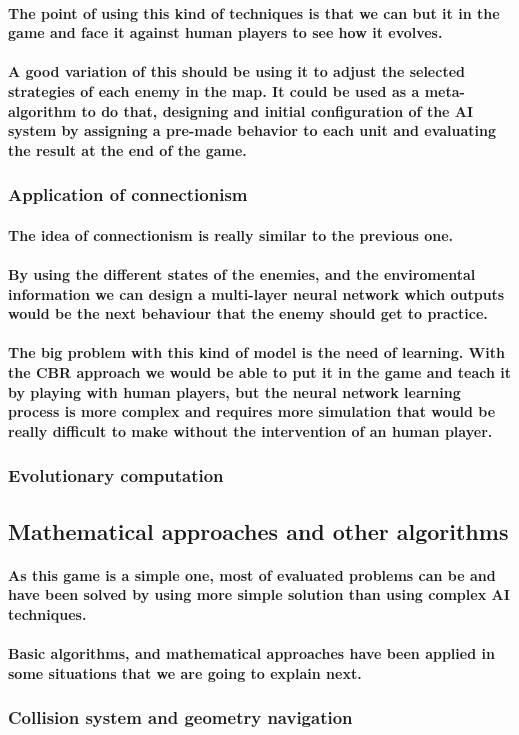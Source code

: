 \documentclass[a4paper,10pt]{article}
\newcommand{\p}[1]{\paragraph{\indent\textnormal{#1}}}
\begin{document}
    \p{The point of using this kind of techniques is that we can but it in the game and face it against human players to see how it evolves.}

     \p{A good variation of this should be using it to adjust the selected strategies of each enemy in the map. It could be used as a \textbf{meta-algorithm} to do that, designing and initial configuration of the AI system by assigning a pre-made behavior to each unit and evaluating the result at the end of the game.}

  \subsubsection{Application of connectionism}

      \p{The idea of connectionism is really similar to the previous one.}

      \p{By using the different states of the enemies, and the enviromental information we can design a multi-layer neural network which outputs would be the next behaviour that the enemy should get to practice.}

      \p{The big problem with this kind of model is the need of learning. With the \textbf{CBR approach} we would be able to put it in the game and teach it by playing with human players, but the \textbf{neural network} learning process is \textbf{more complex} and requires more simulation that would be really \textbf{difficult to make} without the intervention of an human player.}

  \subsubsection{Evolutionary computation}

  
  \subsection{Mathematical approaches and other algorithms}

    \p{As this game is a simple one, most of evaluated problems can be and have been solved by using more simple solution than using complex AI techniques.}

    \p{Basic algorithms, and mathematical approaches have been applied in some situations that we are going to explain next.}

    \subsubsection{Collision system and geometry navigation}
\end{document}
